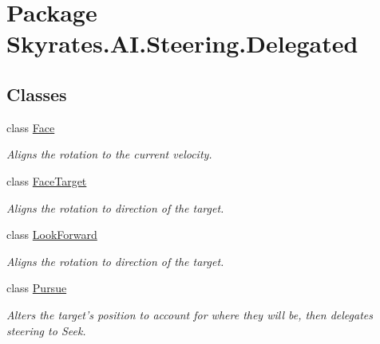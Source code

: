 \hypertarget{namespace_skyrates_1_1_a_i_1_1_steering_1_1_delegated}{\section{Package Skyrates.\-A\-I.\-Steering.\-Delegated}
\label{namespace_skyrates_1_1_a_i_1_1_steering_1_1_delegated}
}
\subsection*{Classes}
\begin{DoxyCompactItemize}
\item 
class \hyperlink{class_skyrates_1_1_a_i_1_1_steering_1_1_delegated_1_1_face}{Face}
\begin{DoxyCompactList}\small\item\em Aligns the rotation to the current velocity. \end{DoxyCompactList}\item 
class \hyperlink{class_skyrates_1_1_a_i_1_1_steering_1_1_delegated_1_1_face_target}{Face\-Target}
\begin{DoxyCompactList}\small\item\em Aligns the rotation to direction of the target. \end{DoxyCompactList}\item 
class \hyperlink{class_skyrates_1_1_a_i_1_1_steering_1_1_delegated_1_1_look_forward}{Look\-Forward}
\begin{DoxyCompactList}\small\item\em Aligns the rotation to direction of the target. \end{DoxyCompactList}\item 
class \hyperlink{class_skyrates_1_1_a_i_1_1_steering_1_1_delegated_1_1_pursue}{Pursue}
\begin{DoxyCompactList}\small\item\em Alters the target's position to account for where they will be, then delegates steering to Seek. \end{DoxyCompactList}\end{DoxyCompactItemize}
